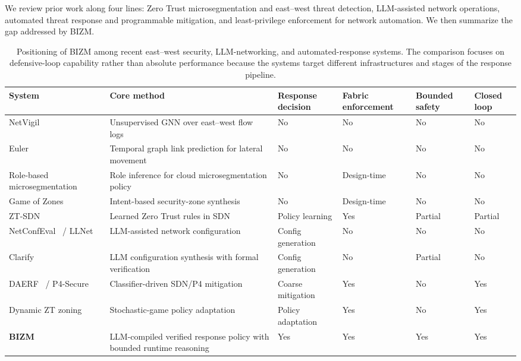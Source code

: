 \documentclass[final,5p]{elsarticle}
\begin{document}
We review prior work along four lines: Zero Trust microsegmentation and east--west threat detection, LLM-assisted network operations, automated threat response and programmable mitigation, and least-privilege enforcement for network automation. We then summarize the gap addressed by BIZM.

\begin{table}[t]
    \centering
    \caption{Positioning of BIZM among recent east--west security, LLM-networking, and automated-response systems. The comparison focuses on defensive-loop capability rather than absolute performance because the systems target different infrastructures and stages of the response pipeline.}
    \label{tab:positioning}
    \small
    \setlength{\tabcolsep}{4.5pt}
    \renewcommand{\arraystretch}{1.12}
    \begin{tabularx}{\textwidth}{@{}L{2.9cm}X C{1.65cm} C{1.45cm} C{1.45cm} C{1.2cm}@{}}
        \toprule
        \textbf{System} &
        \textbf{Core method} &
        \textbf{Response decision} &
        \textbf{Fabric enforcement} &
        \textbf{Bounded safety} &
        \textbf{Closed loop} \\
        \midrule
        NetVigil~\cite{netvigil} &
        Unsupervised GNN over east--west flow logs &
        No & No & No & No \\
        Euler~\cite{king2022euler} &
        Temporal graph link prediction for lateral movement &
        No & No & No & No \\
        Role-based microsegmentation~\cite{mani2025rolebased} &
        Role inference for cloud microsegmentation policy &
        No & Design-time & No & No \\
        Game of Zones~\cite{canavese2025gameofzones} &
        Intent-based security-zone synthesis &
        No & Design-time & No & No \\
        ZT-SDN~\cite{katsis2025ztsdn} &
        Learned Zero Trust rules in SDN &
        Policy learning & Yes & Partial & Partial \\
        NetConfEval~\cite{wang2024netconfeval} / LLNet~\cite{angi2025llnet} &
        LLM-assisted network configuration &
        Config generation & No & No & No \\
        Clarify~\cite{mondal2025clarify} &
        LLM configuration synthesis with formal verification &
        Config generation & No & Partial & No \\
        DAERF~\cite{mhamdi2024daerf} / P4-Secure~\cite{manocchio2025p4secure} &
        Classifier-driven SDN/P4 mitigation &
        Coarse mitigation & Yes & No & Yes \\
        Dynamic ZT zoning~\cite{bello2025dynamic} &
        Stochastic-game policy adaptation &
        Policy adaptation & Yes & No & Yes \\
        \midrule
        \textbf{BIZM} &
        LLM-compiled verified response policy with bounded runtime reasoning &
        Yes & Yes & Yes & Yes \\
        \bottomrule
    \end{tabularx}
\end{table}
\end{document}
